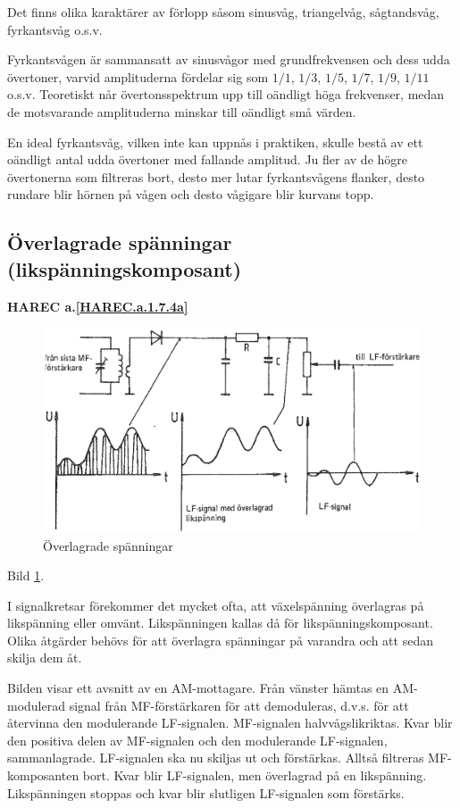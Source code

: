 Det finns olika karaktärer av förlopp såsom sinusvåg, triangelvåg, sågtandsvåg,
fyrkantsvåg o.s.v.

Fyrkantsvågen är sammansatt av sinusvågor med grundfrekvensen och dess udda
övertoner, varvid amplituderna fördelar sig som \(1/1\), \(1/3\), \(1/5\),
\(1/7\), \(1/9\), \(1/11\) o.s.v. Teoretiskt når övertonsspektrum upp till
oändligt höga frekvenser, medan de motsvarande amplituderna minskar till
oändligt små värden.

En ideal fyrkantsvåg, vilken inte kan uppnås i praktiken, skulle bestå av ett
oändligt antal udda övertoner med fallande amplitud. Ju fler av de högre
övertonerna som filtreras bort, desto mer lutar fyrkantsvågens flanker, desto
rundare blir hörnen på vågen och desto vågigare blir kurvans topp.

\subsection{Överlagrade spänningar
(likspänningskomposant)}
\textbf{HAREC a.\ref{HAREC.a.1.7.4a}\label{myHAREC.a.1.7.4a}}

\begin{figure}[h]
\includegraphics[width=\textwidth]{images/cropped_pdfs/bild_2_1-21.pdf}
\caption{Överlagrade spänningar}
\label{fig:BildII1-21}
\end{figure}

Bild \ref{fig:BildII1-21}.

I signalkretsar förekommer det mycket ofta, att växelspänning överlagras på
likspänning eller omvänt. Likspänningen kallas då för likspänningskomposant.
Olika åtgärder behövs för att överlagra spänningar på varandra och att sedan
skilja dem åt.

Bilden visar ett avsnitt av en AM-mottagare. Från vänster hämtas en
AM-modulerad signal från MF-förstärkaren för att demoduleras, d.v.s. för att
återvinna den modulerande LF-signalen. MF-signalen halvvågslikriktas. Kvar blir
den positiva delen av MF-signalen och den modulerande LF-signalen,
sammanlagrade. LF-signalen ska nu skiljas ut och förstärkas. Alltså filtreras
MF-komposanten bort. Kvar blir LF-signalen, men överlagrad på en likspänning.
Likspänningen stoppas och kvar blir slutligen LF-signalen som förstärks.

